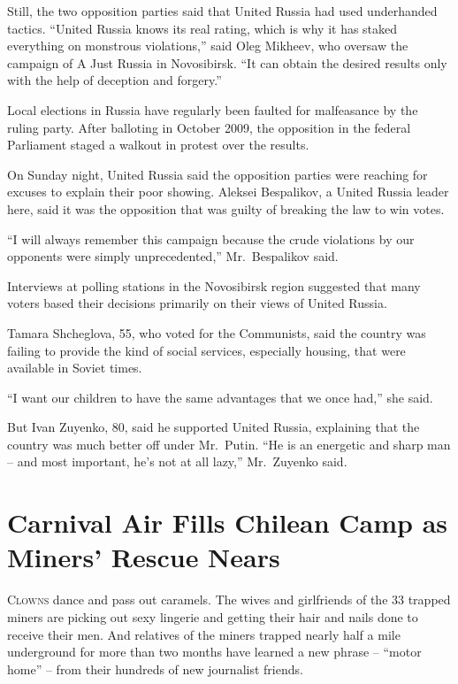 ﻿\documentclass[12pt]{article}
\begin{document}
Still, the two opposition parties said that United Russia had used underhanded tactics. ``United
Russia knows its real rating, which is why it has staked everything on monstrous violations,'' said
Oleg Mikheev, who oversaw the campaign of A Just Russia in Novosibirsk. ``It can obtain the desired
results only with the help of deception and forgery.''

Local elections in Russia have regularly been faulted for malfeasance by the ruling party. After
balloting in October 2009, the opposition in the federal Parliament staged a walkout in protest over
the results.

On Sunday night, United Russia said the opposition parties were reaching for excuses to explain
their poor showing. Aleksei Bespalikov, a United Russia leader here, said it was the opposition that
was guilty of breaking the law to win votes.

``I will always remember this campaign because the crude violations by our opponents were simply
unprecedented,'' Mr.~Bespalikov said.

Interviews at polling stations in the Novosibirsk region suggested that many voters based their
decisions primarily on their views of United Russia.

Tamara Shcheglova, 55, who voted for the Communists, said the country was failing to provide the
kind of social services, especially housing, that were available in Soviet times.

``I want our children to have the same advantages that we once had,'' she said.

But Ivan Zuyenko, 80, said he supported United Russia, explaining that the country was much better
off under Mr.~Putin. ``He is an energetic and sharp man -- and most important, he's not at all
lazy,'' Mr.~Zuyenko said.

\section{Carnival Air Fills Chilean Camp as Miners' Rescue Nears}

\lettrine{C}{lowns} dance and pass out caramels. The wives and girlfriends
of the 33 trapped miners are picking out sexy lingerie and getting their hair and nails done to
receive their men. And relatives of the miners trapped nearly half a mile underground for more than
two months have learned a new phrase -- ``motor home'' -- from their hundreds of new journalist
friends.
\end{document}
